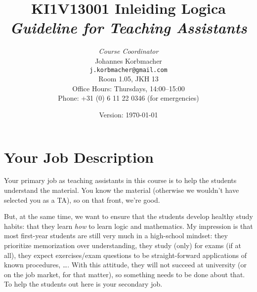 \documentclass[a4paper,11pt,notitlepage]{uureport}
\title{KI1V13001 Inleiding Logica\\[2ex] \emph{Guideline for Teaching Assistants}}
\author{\emph{Course Coordinator}\\[1ex]Johannes Korbmacher\\ \texttt{j.korbmacher@gmail.com}\\Room 1.05, JKH 13\\Office Hours: Thursdays, 14:00--15:00\\Phone: +31 (0) 6 11 22 0346 (for emergencies)}
\date{Version: \today}
\begin{document}
\maketitle

\section*{Your Job Description}

Your primary job as teaching assistants in this course is to help the students understand the material. You know the material (otherwise we wouldn't have selected you as a TA), so on that front, we're good.

But, at the same time, we want to ensure that the students develop healthy study habits: that they learn \emph{how} to learn logic and mathematics.
My impression is that most first-year students are still very much in a high-school mindset:
they prioritize memorization over understanding,
they study (only) for exams (if at all),
they expect exercises/exam questions to be straight-forward applications of known procedures,
\dots.
With this attitude,
they will not succeed at university (or on the job market, for that matter),
so something needs to be done about that.
To help the students out here is your secondary job.
\end{document}
